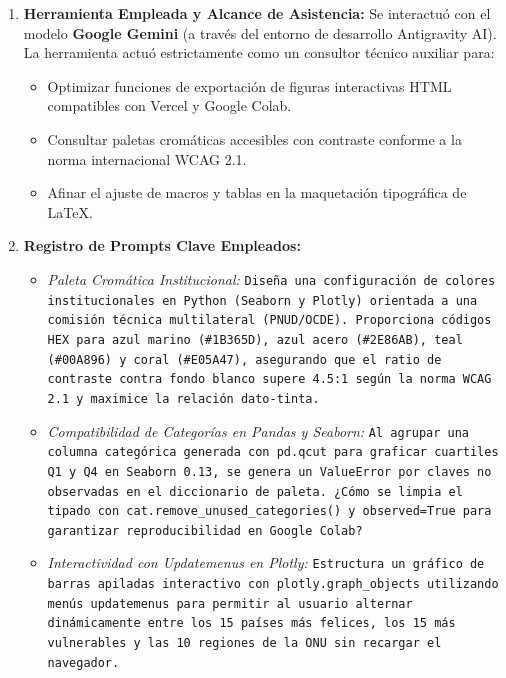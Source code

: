\documentclass[9.5pt, a4paper]{article}
\begin{document}
\begin{enumerate}
    \item \textbf{Herramienta Empleada y Alcance de Asistencia:}  
    Se interactuó con el modelo \textbf{Google Gemini} (a través del entorno de desarrollo Antigravity AI). La herramienta actuó estrictamente como un consultor técnico auxiliar para:
    \begin{itemize}
        \item Optimizar funciones de exportación de figuras interactivas HTML compatibles con Vercel y Google Colab.
        \item Consultar paletas cromáticas accesibles con contraste conforme a la norma internacional WCAG 2.1.
        \item Afinar el ajuste de macros y tablas en la maquetación tipográfica de \LaTeX{}.
    \end{itemize}

    \item \textbf{Registro de Prompts Clave Empleados:}
    \begin{itemize}
        \item \textit{Paleta Cromática Institucional:} \texttt{Diseña una configuración de colores institucionales en Python (Seaborn y Plotly) orientada a una comisión técnica multilateral (PNUD/OCDE). Proporciona códigos HEX para azul marino (\#1B365D), azul acero (\#2E86AB), teal (\#00A896) y coral (\#E05A47), asegurando que el ratio de contraste contra fondo blanco supere 4.5:1 según la norma WCAG 2.1 y maximice la relación dato-tinta.}
        \item \textit{Compatibilidad de Categorías en Pandas y Seaborn:} \texttt{Al agrupar una columna categórica generada con pd.qcut para graficar cuartiles Q1 y Q4 en Seaborn 0.13, se genera un ValueError por claves no observadas en el diccionario de paleta. ¿Cómo se limpia el tipado con cat.remove\_unused\_categories() y observed=True para garantizar reproducibilidad en Google Colab?}
        \item \textit{Interactividad con Updatemenus en Plotly:} \texttt{Estructura un gráfico de barras apiladas interactivo con plotly.graph\_objects utilizando menús updatemenus para permitir al usuario alternar dinámicamente entre los 15 países más felices, los 15 más vulnerables y las 10 regiones de la ONU sin recargar el navegador.}
    \end{itemize}


\end{enumerate}
\end{document}
